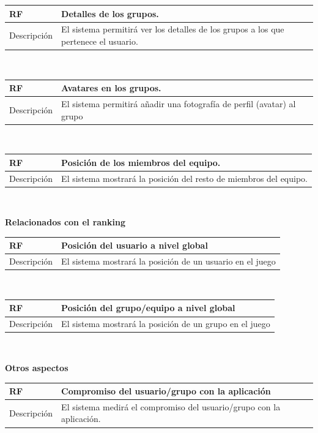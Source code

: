\documentclass[twoside]{report}
\newcommand\addrow[2]{#1 &#2\\ }
\newcommand\addheading[2]{#1 &#2\\ \hline}
\newcommand\tabularhead{\begin{tabular}{lp{0.7\textwidth}}
\hline
}
\newenvironment{req}{\tabularhead}
{\hline\end{tabular}}
\begin{document}
\begin{req}
	\addheading{\textbf{RF\arabic{functionalRequirements}}}{Detalles de los grupos.}
	\addrow{Descripción}{El sistema permitirá ver los detalles de los grupos a los que pertenece el usuario.}
\end{req}\\

\begin{req}
	\addheading{\textbf{RF\arabic{functionalRequirements}}}{Avatares en los grupos.}
	\addrow{Descripción}{El sistema permitirá añadir una fotografía de perfil (avatar) al grupo}
\end{req}\\

\begin{req}
	\addheading{\textbf{RF\arabic{functionalRequirements}}}{Posición de los miembros del equipo.}
	\addrow{Descripción}{El sistema mostrará la posición del resto de miembros del equipo. }
\end{req}\\

\textbf{Relacionados con el ranking}\\

\begin{req}
	\addheading{\textbf{RF\arabic{functionalRequirements}}}{Posición del usuario a nivel global}
	\addrow{Descripción}{El sistema mostrará la posición de un usuario en el juego}
\end{req}\\

\begin{req}
	\addheading{\textbf{RF\arabic{functionalRequirements}}}{Posición del grupo/equipo a nivel global}
	\addrow{Descripción}{El sistema mostrará la posición de un grupo en el juego}
\end{req}\\

\textbf{Otros aspectos}\\

\begin{req}
	\addheading{\textbf{RF\arabic{functionalRequirements}}}{Compromiso del usuario/grupo con la aplicación}
	\addrow{Descripción}{El sistema medirá el compromiso del usuario/grupo con la aplicación.}
\end{req}\\
\end{document}
